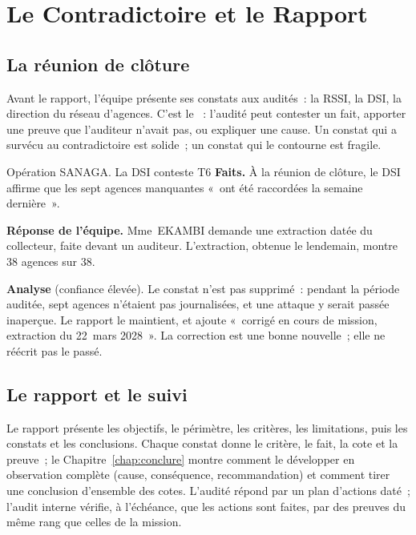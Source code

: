 \section{Le Contradictoire et le Rapport}
\label{sec:c06-contradictoire}

\subsection{La réunion de clôture}

Avant le rapport, l'équipe présente ses constats aux audités~: la RSSI, la
DSI, la direction du réseau d'agences. C'est le
~: l'audité peut contester
un fait, apporter une preuve que l'auditeur n'avait pas, ou expliquer une
cause. Un constat qui a survécu au contradictoire est solide~; un constat
qui le contourne est fragile.

\begin{boxscenario}{Opération SANAGA. La DSI conteste T6}
\textbf{Faits.} À la réunion de clôture, le DSI affirme que les sept
agences manquantes «~ont été raccordées la semaine dernière~».

\medskip
\textbf{Réponse de l'équipe.} Mme~EKAMBI demande une extraction datée du
collecteur, faite devant un auditeur. L'extraction, obtenue le lendemain,
montre 38 agences sur 38.

\medskip
\textbf{Analyse} (confiance élevée). Le constat n'est pas supprimé~: pendant
la période auditée, sept agences n'étaient pas journalisées, et une
attaque y serait passée inaperçue. Le rapport le maintient, et ajoute
«~corrigé en cours de mission, extraction du 22~mars 2028~». La correction
est une bonne nouvelle~; elle ne réécrit pas le passé.
\end{boxscenario}

\subsection{Le rapport et le suivi}

Le rapport présente les objectifs, le périmètre, les critères, les
limitations, puis les constats et les conclusions. Chaque constat donne le
critère, le fait, la cote et la preuve~; le Chapitre~\ref{chap:conclure}
montre comment le développer en observation complète (cause, conséquence,
recommandation) et comment tirer une conclusion d'ensemble des cotes.
L'audité répond par un plan d'actions daté~; l'audit interne vérifie, à
l'échéance, que les actions sont faites, par des preuves du même rang que
celles de la mission.

